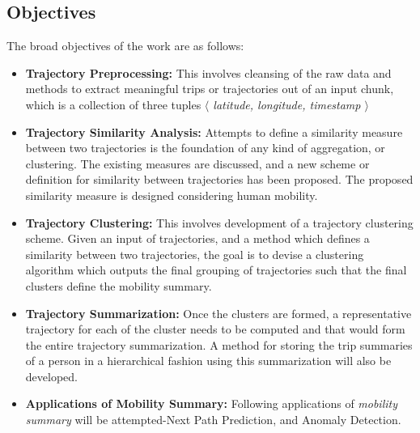 \subsection{Objectives}
The broad objectives of the work are as follows:
\begin{itemize}
\item{\textbf{Trajectory Preprocessing:}}
This involves cleansing of the raw data and methods to extract meaningful trips or trajectories out of an input chunk, which is a collection of three tuples \emph{$\langle$ latitude, longitude, timestamp $\rangle$ }
\item{\textbf{Trajectory Similarity Analysis:}}
Attempts to define a similarity measure between two trajectories is the foundation of any kind of aggregation, or clustering. The existing measures are discussed, and a new scheme or definition for similarity between trajectories has been proposed. The proposed similarity measure is designed considering human mobility.
\item{\textbf{Trajectory Clustering:}}
This involves development of a trajectory clustering scheme. Given an input of trajectories, and a method which defines a similarity between two trajectories, the goal is to devise a clustering algorithm which outputs the final grouping of trajectories such that the final clusters define the mobility summary.
\item{\textbf{Trajectory Summarization:}}
Once the clusters are formed, a representative trajectory for each of the cluster needs to be computed and that would form the entire trajectory summarization. A method for storing the trip summaries of a person in a hierarchical fashion using this summarization will also be developed. 
\item{\textbf{Applications of Mobility Summary:}}
Following applications of \emph{mobility summary} will be attempted-Next Path Prediction, and Anomaly Detection.
\end{itemize}


